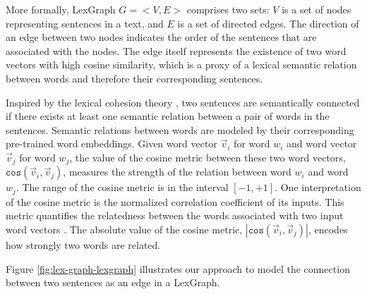 More formally, LexGraph $G=<V,E>$ comprises two sets: $V$ is a set of nodes representing sentences in a text, and $E$ is a set of directed edges. 
The direction of an edge between two nodes indicates the order of the sentences that are associated with the nodes. 
The edge itself represents the existence of two word vectors with high cosine similarity, which is a proxy of a lexical semantic relation between words and therefore their corresponding sentences. 

Inspired by the lexical cohesion theory \cite{halliday76}, two sentences are semantically connected if there exists at least one semantic relation between a pair of words in the sentences. 
Semantic relations between words are modeled by their corresponding \mbox{pre-trained} word embeddings.  
Given word vector $\vec{v}_i$ for word $w_i$ and word vector $\vec{v}_j$ for word $w_j$, the value of the cosine metric between these two word vectors, $\mathtt{cos}(\vec{v}_i,\vec{v}_j)$, measures the strength of the relation between word $w_i$ and word $w_j$. 
The range of the cosine metric is in the interval $\left[ -1, +1 \right]$.  
One interpretation of the cosine metric is the normalized correlation coefficient of its inputs.
This metric quantifies the relatedness between the words associated with two input word vectors \cite{manning99}. 
The absolute value of the cosine metric, $|\mathtt{cos}(\vec{v}_i,\vec{v}_j)|$, encodes how strongly two words are related.  

Figure \ref{fig:lex-graph-lexgraph} illustrates our approach to model the connection between two sentences as an edge in a LexGraph. 

